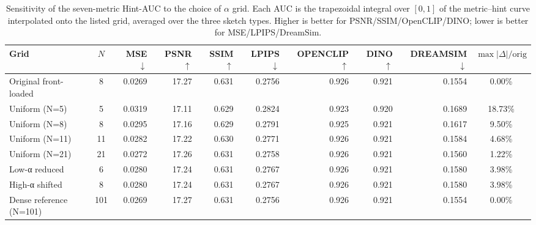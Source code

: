 \begin{table}[t]
  \centering
  \caption{Sensitivity of the seven-metric Hint-AUC to the choice of $\alpha$ grid. Each AUC is the trapezoidal integral over $[0,1]$ of the metric--hint curve interpolated onto the listed grid, averaged over the three sketch types. Higher is better for PSNR/SSIM/OpenCLIP/DINO; lower is better for MSE/LPIPS/DreamSim.}
  \label{tab:S-R2-1-B-2-7m}
  \small
  \begin{tabular}{l c rrrrrrr c}
    \toprule
    Grid & $N$ & MSE $\downarrow$ & PSNR $\uparrow$ & SSIM $\uparrow$ & LPIPS $\downarrow$ & OPENCLIP $\uparrow$ & DINO $\uparrow$ & DREAMSIM $\downarrow$ & $\max\!\big|\Delta\big|/\mathrm{orig}$ \\
    \midrule
    Original front-loaded      &   8 & 0.0269 & 17.27 & 0.631 & 0.2756 & 0.926 & 0.921 & 0.1554 &  0.00\% \\
    Uniform (N=5)              &   5 & 0.0319 & 17.11 & 0.629 & 0.2824 & 0.923 & 0.920 & 0.1689 & 18.73\% \\
    Uniform (N=8)              &   8 & 0.0295 & 17.16 & 0.629 & 0.2791 & 0.925 & 0.921 & 0.1617 &  9.50\% \\
    Uniform (N=11)             &  11 & 0.0282 & 17.22 & 0.630 & 0.2771 & 0.926 & 0.921 & 0.1584 &  4.68\% \\
    Uniform (N=21)             &  21 & 0.0272 & 17.26 & 0.631 & 0.2758 & 0.926 & 0.921 & 0.1560 &  1.22\% \\
    Low-α reduced              &   6 & 0.0280 & 17.24 & 0.631 & 0.2767 & 0.926 & 0.921 & 0.1580 &  3.98\% \\
    High-α shifted             &   8 & 0.0280 & 17.24 & 0.631 & 0.2767 & 0.926 & 0.921 & 0.1580 &  3.98\% \\
    Dense reference (N=101)    & 101 & 0.0269 & 17.27 & 0.631 & 0.2756 & 0.926 & 0.921 & 0.1554 &  0.00\% \\
    \bottomrule
  \end{tabular}
\end{table}
